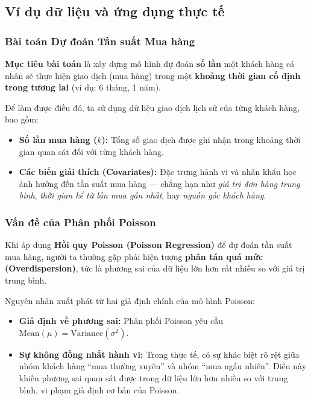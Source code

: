 \subsection{Ví dụ dữ liệu và ứng dụng thực tế}

\subsubsection*{Bài toán Dự đoán Tần suất Mua hàng}

\textbf{Mục tiêu bài toán} là xây dựng mô hình dự đoán \textbf{số lần}
một khách hàng cá nhân sẽ thực hiện giao dịch (mua hàng) 
trong một \textbf{khoảng thời gian cố định trong tương lai} 
(ví dụ: 6 tháng, 1 năm).  

Để làm được điều đó, ta sử dụng dữ liệu giao dịch lịch sử của từng khách hàng, bao gồm:

\begin{itemize}
    \item \textbf{Số lần mua hàng ($k$):} Tổng số giao dịch được ghi nhận trong khoảng thời gian quan sát đối với từng khách hàng.
    \item \textbf{Các biến giải thích (Covariates):} Đặc trưng hành vi và nhân khẩu học ảnh hưởng đến tần suất mua hàng — chẳng hạn như \textit{giá trị đơn hàng trung bình}, \textit{thời gian kể từ lần mua gần nhất}, hay \textit{nguồn gốc khách hàng}.
\end{itemize}

\subsubsection*{Vấn đề của Phân phối Poisson} 

Khi áp dụng \textbf{Hồi quy Poisson (Poisson Regression)} để dự đoán tần suất mua hàng,  
người ta thường gặp phải hiện tượng \textbf{phân tán quá mức (Overdispersion)}, tức là 
phương sai của dữ liệu lớn hơn rất nhiều so với giá trị trung bình.  

Nguyên nhân xuất phát từ hai giả định chính của mô hình Poisson:
\begin{itemize}
    \item \textbf{Giả định về phương sai:} Phân phối Poisson yêu cầu $\text{Mean}(\mu) = \text{Variance}(\sigma^2)$.
    \item \textbf{Sự không đồng nhất hành vi:} Trong thực tế, có sự khác biệt rõ rệt giữa nhóm khách hàng “mua thường xuyên” và nhóm “mua ngẫu nhiên”.  
    Điều này khiến phương sai quan sát được trong dữ liệu lớn hơn nhiều so với trung bình, vi phạm giả định cơ bản của Poisson.
\end{itemize}

